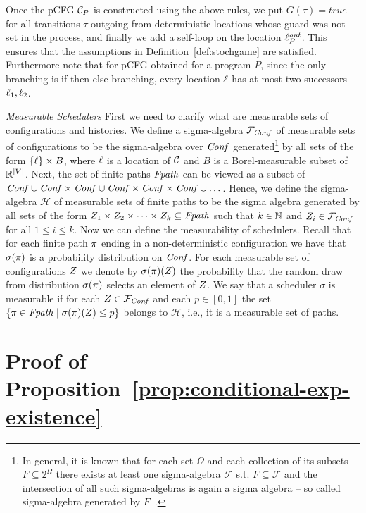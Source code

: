 Once the pCFG $\mathcal{C}_P$ is constructed using the above rules, we put
$G(\tau)=\textit{true}$ for all transitions $\tau$ outgoing from deterministic
locations whose guard was not set in the process, and finally we add a self-loop
on the location $\ell^{\mathit{out}}_P$. This ensures that the assumptions in
Definition~\ref{def:stochgame} are satisfied.
Furthermore note that for pCFG obtained for a program $P$, since the only
branching is if-then-else branching, every location $\ell$ has at most two
successors $\ell_1,\ell_2$.

\emph{Measurable Schedulers} 
First we need to clarify what are measurable sets of configurations 
and histories. We define a sigma-algebra $\mathcal{F}_{\mathit{Conf}}$ of measurable 
sets of configurations to be the sigma-algebra 
over $\mathit{Conf}$ 
generated\footnote{In general, it is known that for each set $\Omega$ and each 
collection of its subsets $F\subseteq 2^{\Omega}$ there exists at least one 
sigma-algebra $\mathcal{F}$ s.t. $F\subseteq \mathcal{F}$ and the intersection 
of all such sigma-algebras is again a sigma algebra --  so called 
sigma-algebra 
generated by $F$~\cite{Billingsley:book}.} by 
all sets of the form $\{\ell\}\times B$, where $\ell$ is a location of $\mathcal{C}$ 
and  
$B$ is a Borel-measurable subset 
of $\mathbb{R}^{|V|}$. Next, the set of finite paths $\mathit{Fpath}$ can be viewed as 
a subset of $\mathit{Conf}\cup \mathit{Conf}\times\mathit{Conf} \cup \mathit{Conf}\times\mathit{Conf}\times\mathit{Conf} \cup 
\dots$. Hence, we define the sigma-algebra $\mathcal{H}$ of measurable sets of 
finite paths 
to be the sigma algebra generated by all sets of the form $Z_1\times 
Z_2 \times 
\cdots \times Z_k \subseteq \mathit{Fpath}$ such that $k\in \mathbb{N}$ and 
$Z_i \in 
\mathcal{F}_{\mathit{Conf}}$ for 
all $1\leq i \leq k$. Now we can define the measurability of schedulers. 
Recall 
that for each finite path $\pi$ ending in a non-deterministic 
configuration 
we have that $\sigma(\pi)$ is a probability distribution on $\mathit{Conf}$. For 
each measurable set of configurations $Z$ we denote by 
$\sigma(\pi)(Z)$ the probability that the random draw from 
distribution $\sigma(\pi)$ selects an element of $Z$. We say that 
a 
scheduler $\sigma$ is measurable if for each $Z \in 
\mathcal{F}_{\mathit{Conf}}$ 
and each $p\in[0,1]$ the set $\{\pi \in \mathit{Fpath} \mid 
\sigma(\pi)(Z)\leq p\}$ belongs to $\mathcal{H}$, i.e., it is a 
measurable set of paths.

\def\xx{\ref{prop:conditional-exp-existence}}

\section{Proof of Proposition~\xx}

